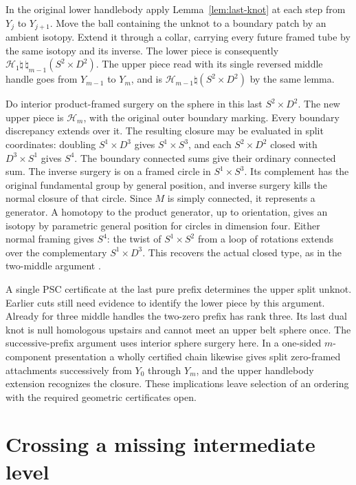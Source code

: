 \documentclass[11pt,letterpaper]{article}
\numberwithin{equation}{section}
\theoremstyle{remark}
\newcommand{\HB}[1]{\mathcal H_{#1}}
\begin{document}
In the original lower handlebody apply Lemma~\ref{lem:last-knot}
at each step from \(Y_j\) to \(Y_{j+1}\). Move the ball containing
the unknot to a boundary patch by an ambient isotopy. Extend it
through a collar, carrying every future framed tube by the same
isotopy and its inverse. The lower piece is consequently
\(\HB{1}\natural\,\natural_{m-1}(S^2\times D^2)\).
The upper piece read with its single reversed middle handle goes
from \(Y_{m-1}\) to \(Y_m\), and is
\(\HB{m-1}\natural(S^2\times D^2)\) by the same lemma.

Do interior product-framed surgery on the sphere in this last
\(S^2\times D^2\). The new upper piece is \(\HB{m}\), with the
original outer boundary marking. Every boundary discrepancy extends
over it. The resulting closure may be evaluated in split coordinates:
doubling \(S^1\times D^3\) gives \(S^1\times S^3\), and each
\(S^2\times D^2\) closed with \(D^3\times S^1\) gives \(S^4\).
The boundary connected sums give their ordinary connected sum.
The inverse surgery is on a framed circle in \(S^1\times S^3\).
Its complement has the original fundamental group by general position,
and inverse surgery kills the normal closure of that circle. Since
\(M\) is simply connected, it represents a generator. A homotopy
to the product generator, up to orientation, gives an isotopy by
parametric general position for circles in dimension four. Either
normal framing gives \(S^4\): the twist of \(S^1\times S^2\)
from a loop of rotations extends over the complementary
\(S^1\times D^3\). This recovers the actual closed type, as in the
two-middle argument \cite{Baker2026MarkedHeights}.

A single PSC certificate at the last pure prefix determines the
upper split unknot. Earlier cuts still need evidence to identify
the lower piece by this argument. Already for three middle handles
the two-zero prefix has rank three. Its last dual knot is null
homologous upstairs and cannot meet an upper belt sphere once.
The successive-prefix argument uses interior sphere surgery here.
In a one-sided \(m\)-component presentation a wholly certified
chain likewise gives split zero-framed attachments successively
from \(Y_0\) through \(Y_m\), and the upper handlebody extension
recognizes the closure. These implications leave selection of an
ordering with the required geometric certificates open.

\section{Crossing a missing intermediate level}\label{sec:pair}
\end{document}
